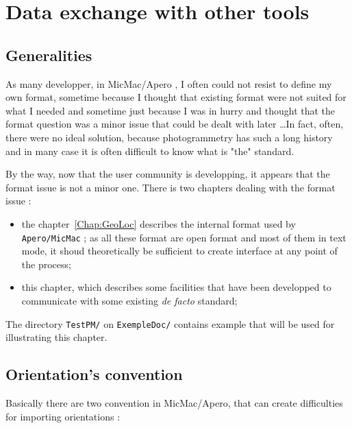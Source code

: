 \chapter{Data exchange with other tools}

\section{Generalities}

As many developper, in MicMac/Apero , I often could not resist to 
define my own format, sometime because I thought that existing 
format were not suited for what I needed and sometime just because I was in
hurry and thought that the format question was a minor issue that could be
dealt with later \dots In fact, often, there were no ideal solution, because 
photogrammetry has such a long history and in many case it is often difficult to
know what is "the" standard.

By the way, now that the user community is developping, it appears that the format issue
is not a minor one.   There is two chapters dealing with the format issue :

\begin{itemize}
   \item  the chapter~\ref{Chap:GeoLoc} describes the internal format used
          by {\tt Apero/MicMac} ; as all these
          format are open format and most of them in text mode, it shoud theoretically be sufficient
          to create interface at any point of the process;

   \item  this chapter, which describes some facilities that have been developped to communicate
          with some existing \emph{de facto} standard;
\end{itemize}

The directory {\tt TestPM/} on {\tt ExempleDoc/} contains example that will be used for
illustrating this chapter.


\section{Orientation's convention}

Basically there are two convention in MicMac/Apero, that can create
difficulties for importing orientations :

